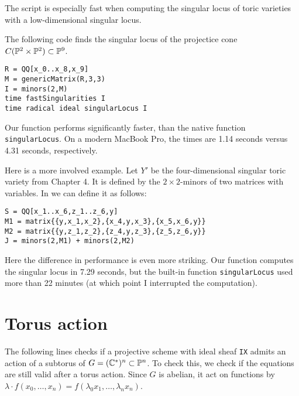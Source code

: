 The script is especially fast when computing the singular locus of toric varieties with a low-dimensional singular locus.

The following code finds the singular locus of the projectice cone $C(\P^2 \times \P^2) \subset \P^9$.

\begin{lstlisting}[language=Macaulay2]
R = QQ[x_0..x_8,x_9]
M = genericMatrix(R,3,3)
I = minors(2,M)
time fastSingularities I
time radical ideal singularLocus I
\end{lstlisting}

Our function performs significantly faster, than the native function \texttt{singularLocus}. On a modern MacBook Pro, the times are 1.14 seconds versus 4.31 seconds, respectively.

Here is a more involved example. Let $Y'$ be the four-dimensional singular toric variety from Chapter 4. It is defined by the $2 \times 2$-minors of two matrices with variables. In \MM we can define it as follows:
\begin{lstlisting}[language=Macaulay2]
S = QQ[x_1..x_6,z_1..z_6,y]
M1 = matrix{{y,x_1,x_2},{x_4,y,x_3},{x_5,x_6,y}}
M2 = matrix{{y,z_1,z_2},{z_4,y,z_3},{z_5,z_6,y}}
J = minors(2,M1) + minors(2,M2)
\end{lstlisting}

Here the difference in performance is even more striking. Our function computes the singular locus in 7.29 seconds, but the built-in function \texttt{singularLocus} used more than 22 minutes (at which point I interrupted the computation).

\section{Torus action}

The following lines checks if a projective scheme with ideal sheaf \texttt{IX} admits an action of a subtorus of $G=(\C^\ast)^n \subset \P^n$. To check this, we check if the equations are still valid after a torus action. Since $G$ is abelian, it act on functions by $\lambda \cdot f(x_0,\ldots,x_n)=f(\lambda_0 x_1, \ldots, \lambda_n x_n)$. 


